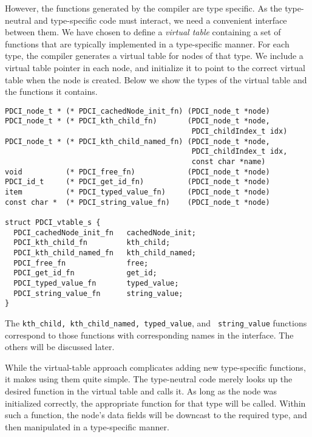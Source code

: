 \documentclass{article}
\begin{document}
However, the \pads functions generated by the compiler are type
specific. As the type-neutral and type-specific code must interact, we
need a convenient interface between them. 
We have chosen to define a {\em virtual table} containing a set of
functions that are typically implemented in a type-specific manner.
For each type, the compiler generates a virtual table for nodes of
that type. We include a virtual table pointer in each node, and
initialize it to point to the correct virtual table when the node is
created. Below we show the types of the virtual table and the
functions it contains.
\begin{verbatim}
PDCI_node_t * (* PDCI_cachedNode_init_fn) (PDCI_node_t *node) 
PDCI_node_t * (* PDCI_kth_child_fn)       (PDCI_node_t *node, 
                                           PDCI_childIndex_t idx) 
PDCI_node_t * (* PDCI_kth_child_named_fn) (PDCI_node_t *node, 
                                           PDCI_childIndex_t idx, 
                                           const char *name) 
void          (* PDCI_free_fn)            (PDCI_node_t *node)
PDCI_id_t     (* PDCI_get_id_fn)          (PDCI_node_t *node)
item          (* PDCI_typed_value_fn)     (PDCI_node_t *node) 
const char *  (* PDCI_string_value_fn)    (PDCI_node_t *node)

struct PDCI_vtable_s {
  PDCI_cachedNode_init_fn   cachedNode_init;
  PDCI_kth_child_fn         kth_child;
  PDCI_kth_child_named_fn   kth_child_named;
  PDCI_free_fn              free;
  PDCI_get_id_fn            get_id;
  PDCI_typed_value_fn       typed_value;
  PDCI_string_value_fn      string_value;
}
\end{verbatim}

The {\tt kth\_child, kth\_child\_named, typed\_value}, and {\tt
  string\_value} functions correspond to those functions with
corresponding names in the \pglx interface. The others will be
discussed later.

While the virtual-table approach complicates adding new type-specific
functions, it makes using them quite simple.  The type-neutral code
merely looks up the desired function in the virtual table and calls
it. As long as the node was initialized correctly, the appropriate
function for that type will be called. Within such a function, the
node's data fields will be downcast to the required type, and then
manipulated in a type-specific manner.
\end{document}
